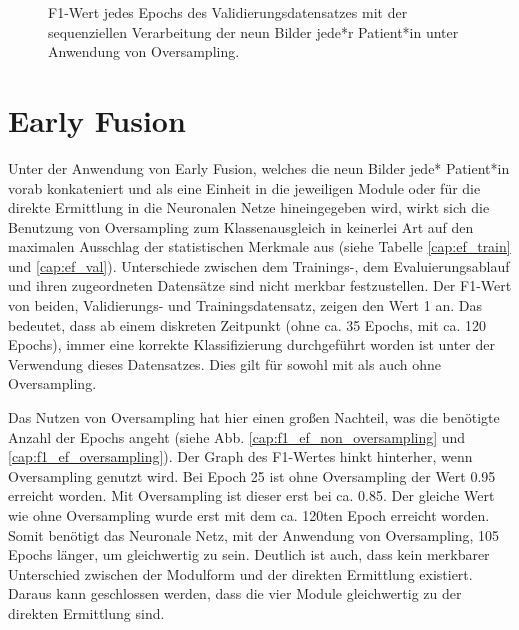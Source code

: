 \begin{figure}[b]\centering
\makebox[0pt]{}
\caption[F1-Wert jedes Epochs des Validierungsdatensatzes mit der sequenziellen Verarbeitung unter Anwendung von Oversampling]{F1-Wert jedes Epochs des Validierungsdatensatzes mit der sequenziellen Verarbeitung der neun Bilder jede*r Patient*in unter Anwendung von Oversampling.}\label{cap:f1_sequential_oversampling}
\end{figure}\label{fig:f1_sequential_oversampling}





\clearpage
\section{Early Fusion}\label{earlyfusion}

Unter der Anwendung von Early Fusion, welches die neun Bilder jede* Patient*in vorab konkateniert und als eine Einheit in die jeweiligen Module oder für die direkte Ermittlung in die Neuronalen Netze hineingegeben wird, wirkt sich die Benutzung von Oversampling zum Klassenausgleich in keinerlei Art auf den maximalen Ausschlag der statistischen Merkmale aus (siehe Tabelle \ref{cap:ef_train} und \ref{cap:ef_val}). Unterschiede zwischen dem Trainings-, dem Evaluierungsablauf und ihren zugeordneten Datensätze sind nicht merkbar festzustellen. Der F1-Wert von beiden, Validierungs- und Trainingsdatensatz, zeigen den Wert 1 an. Das bedeutet, dass ab einem diskreten Zeitpunkt (ohne ca. 35 Epochs, mit ca. 120 Epochs), immer eine korrekte Klassifizierung durchgeführt worden ist unter der Verwendung dieses Datensatzes. Dies gilt für sowohl mit als auch ohne Oversampling.

Das Nutzen von Oversampling hat hier einen großen Nachteil, was die benötigte Anzahl der Epochs angeht (siehe Abb. \ref{cap:f1_ef_non_oversampling} und \ref{cap:f1_ef_oversampling}). Der Graph des F1-Wertes hinkt hinterher, wenn Oversampling genutzt wird. Bei Epoch 25 ist ohne Oversampling der Wert 0.95 erreicht worden. Mit Oversampling ist dieser erst bei ca. 0.85. Der gleiche Wert wie ohne Oversampling wurde erst mit dem ca. 120ten Epoch erreicht worden. Somit benötigt das Neuronale Netz, mit der Anwendung von Oversampling, 105 Epochs länger, um gleichwertig zu sein. Deutlich ist auch, dass kein merkbarer Unterschied zwischen der Modulform und der direkten Ermittlung existiert. Daraus kann geschlossen werden, dass die vier Module gleichwertig zu der direkten Ermittlung sind.

